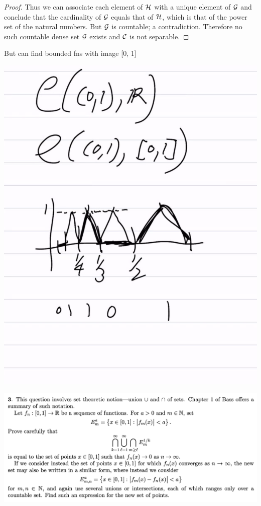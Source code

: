 \begin{enumerate}
\begin{proof}
    Thus we can associate each element of $\mathcal H$ with a unique element of $\mathcal G$ and conclude that the
    cardinality of $\mathcal G$ equals that of $\mathcal H$, which is that of the power set of the natural numbers.
    But $\mathcal G$ is countable; a contradiction. Therefore no such countable dense set $\mathcal G$ exists and $\mathcal C$
    is not separable.
  \end{proof}


  But can find bounded fns with image [0, 1]

  \begin{mdframed}
    \includegraphics[width=400pt]{img/analysis--berkeley-202a-hw-7459.png}
  \end{mdframed}
\end{enumerate}


\newpage
\begin{mdframed}
  \includegraphics[width=400pt]{img/analysis--berkeley-202a--homework-1-8349.png}
\end{mdframed}


